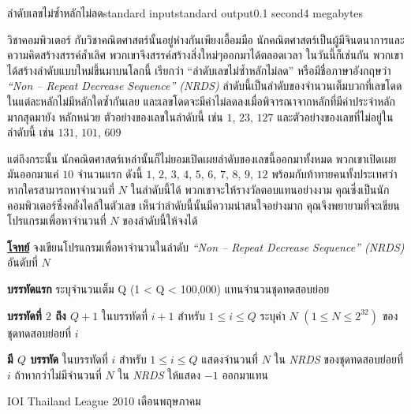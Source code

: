 \documentclass[11pt,a4paper]{article}
\begin{document}
\begin{problem}{ลำดับเลขไม่ซ้ำหลักไม่ลด}{standard input}{standard output}{0.1 second}{4 megabytes}

วิชาคอมพิวเตอร์ กับวิชาคณิตศาสตร์นั้นอยู่ห่างกันเพียงเอื้อมมือ นักคณิตศาสตร์เป็นผู้มีจินตนาการและความคิดสร้างสรรค์ล้ำเลิศ พวกเขาจึงสรรค์สร้างสิ่งใหม่ๆออกมาได้ตลอดเวลา ในวันนี้ก็เช่นกัน พวกเขาได้สร้างลำดับแบบใหม่ขึ้นมาบนโลกนี้ เรียกว่า “ลำดับเลขไม่ซ้ำหลักไม่ลด” หรือมีชื่อภาษาอังกฤษว่า \textit{“Non – Repeat Decrease Sequence” (NRDS)} ลำดับนี้เป็นลำดับของจำนวนเต็มบวกที่เลขโดดในแต่ละหลักไม่มีหลักใดซ้ำกันเลย และเลขโดดจะมีค่าไม่ลดลงเมื่อพิจารณาจากหลักที่มีค่าประจำหลักมากสุดมายัง หลักหน่วย ตัวอย่างของเลขในลำดับนี้ เช่น $1$, $23$, $127$ และตัวอย่างของเลขที่ไม่อยู่ในลำดับนี้ เช่น $131$, $101$, $609$

                แต่ถึงกระนั้น นักคณิตศาสตร์เหล่านั้นก็ไม่ยอมเปิดเผยลำดับของเลขนี้ออกมาทั้งหมด พวกเขาเปิดเผยมันออกมาแค่ $10$ จำนวนแรก ดังนี้ $1$, $2$, $3$, $4$, $5$, $6$, $7$, $8$, $9$, $12$ พร้อมกับท้าทายคนทั้งประเทศว่าหากใครสามารถหาจำนวนที่ $N$ ในลำดับนี้ได้ พวกเขาจะให้รางวัลตอบแทนอย่างงาม คุณซึ่งเป็นนักคอมพิวเตอร์ซึ่งคลั่งไคล้ในตัวเลข เห็นว่าลำดับนี้นั้นมีความน่าสนใจอย่างมาก คุณจึงพยายามที่จะเขียนโปรแกรมเพื่อหาจำนวนที่ $N$ ของลำดับนี้ให้จงได้

\bigskip
\underline{\textbf{โจทย์}}  จงเขียนโปรแกรมเพื่อหาจำนวนในลำดับ  \textit{“Non – Repeat Decrease Sequence” (NRDS)} อันดับที่ $N$


\InputFile

\textbf{บรรทัดแรก} ระบุจำนวนเต็ม Q (1 < Q < 100,000) แทนจำนวนชุดทดสอบย่อย 

\textbf{บรรทัดที่ $2$ ถึง $Q+1$} ในบรรทัดที่ $i+1$ สำหรับ $1 \leq i \leq Q$ ระบุค่า $N$ $(1 \leq N \leq 2^{32})$ ของชุดทดสอบย่อยที่ $i$


\OutputFile

\textbf{มี $Q$ บรรทัด} ในบรรทัดที่ $i$ สำหรับ $1 \leq i \leq Q$ แสดงจำนวนที่ $N$ ใน \textit{NRDS} ของชุดทดสอบย่อยที่ $i$ ถ้าหากว่าไม่มีจำนวนที่ $N$ ใน \textit{NRDS} ให้แสดง $-1$ ออกมาแทน

\Examples

\begin{example}
%
\end{example}


\Source

IOI Thailand League 2010 เดือนพฤษภาคม

\end{problem}
\end{document}
